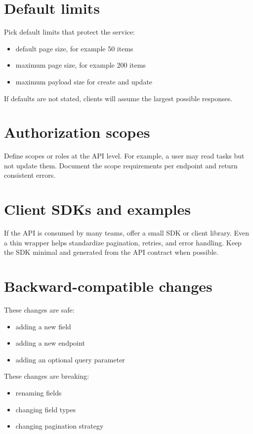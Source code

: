 \section{Default limits}
Pick default limits that protect the service:
\begin{itemize}[nosep]
  \item default page size, for example 50 items
  \item maximum page size, for example 200 items
  \item maximum payload size for create and update
\end{itemize}

If defaults are not stated, clients will assume the largest possible responses.

\section{Authorization scopes}
Define scopes or roles at the API level.
For example, a user may read tasks but not update them.
Document the scope requirements per endpoint and return consistent errors.

\section{Client SDKs and examples}
If the API is consumed by many teams, offer a small SDK or client library.
Even a thin wrapper helps standardize pagination, retries, and error handling.
Keep the SDK minimal and generated from the API contract when possible.

\section{Backward-compatible changes}
These changes are safe:
\begin{itemize}[nosep]
  \item adding a new field
  \item adding a new endpoint
  \item adding an optional query parameter
\end{itemize}

These changes are breaking:
\begin{itemize}[nosep]
  \item renaming fields
  \item changing field types
  \item changing pagination strategy
\end{itemize}

